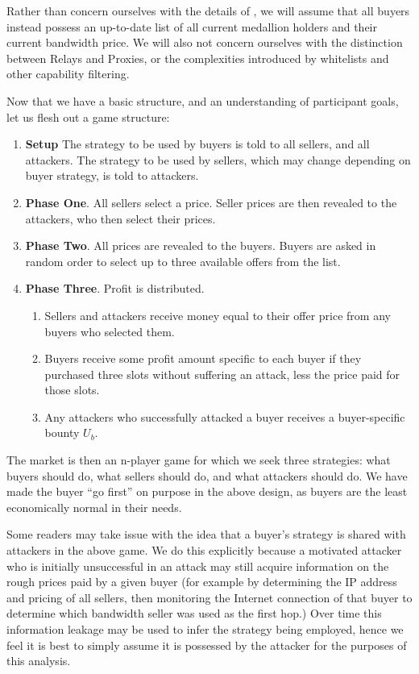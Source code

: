 Rather than concern ourselves with the details of \tOM{}, we will
assume that all buyers instead possess an up-to-date list of all
current medallion holders and their current bandwidth price. We will
also not concern ourselves with the distinction between Relays and
Proxies, or the complexities introduced by whitelists and other
capability filtering.

Now that we have a basic structure, and an understanding of
participant goals, let us flesh out a game structure:

\begin{enumerate}
\item \textbf{Setup} The strategy to be used by buyers is told to all
  sellers, and all attackers. The strategy to be used by sellers,
  which may change depending on buyer strategy, is told to attackers.
\item \textbf{Phase One}. All sellers select a price. Seller prices
  are then revealed to the attackers, who then select their prices.
\item \textbf{Phase Two}. All prices are revealed to the
  buyers. Buyers are asked in random order to select up to three
  available offers from the list.
\item \textbf{Phase Three}. Profit is distributed.
  \begin{enumerate}
  \item Sellers and attackers receive money equal to their offer price
    from any buyers who selected them.
  \item Buyers receive some profit amount specific to each buyer if
    they purchased three slots without suffering an attack, less the
    price paid for those slots.
  \item Any attackers who successfully attacked a buyer receives a
    buyer-specific bounty $U_b$.
  \end{enumerate}
\end{enumerate}

The market is then an n-player game for which we seek three
strategies: what buyers should do, what sellers should do, and what
attackers should do. We have made the buyer ``go first'' on purpose in
the above design, as buyers are the least economically normal in their
needs.

Some readers may take issue with the idea that a buyer's strategy is
shared with attackers in the above game. We do this explicitly because
a motivated attacker who is initially unsuccessful in an attack may
still acquire information on the rough prices paid by a given buyer
(for example by determining the IP address and pricing of all sellers,
then monitoring the Internet connection of that buyer to determine
which bandwidth seller was used as the first hop.) Over time this
information leakage may be used to infer the strategy being employed,
hence we feel it is best to simply assume it is possessed by the
attacker for the purposes of this analysis.

